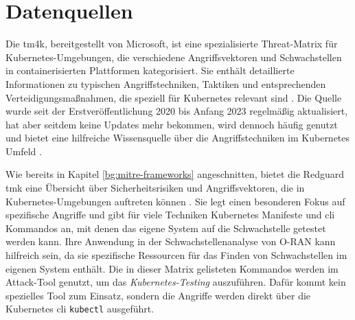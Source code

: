 \section{Datenquellen}
\label{sec:datenquellen}
\par Die \gls{tm4k}, bereitgestellt von Microsoft, ist eine spezialisierte Threat-Matrix für Kubernetes-Umgebungen, die verschiedene Angriffsvektoren und Schwachstellen in containerisierten Plattformen kategorisiert. Sie enthält detaillierte Informationen zu typischen Angriffstechniken, Taktiken und entsprechenden Verteidigungsmaßnahmen, die speziell für Kubernetes relevant sind \autocite{TacticsThreatMatrix}. Die Quelle wurde seit der Erstveröffentlichung 2020 bis Anfang 2023 regelmäßig aktualisiert, hat aber seitdem keine Updates mehr bekommen, wird dennoch häufig genutzt und bietet eine hilfreiche Wissensquelle über die Angriffstechniken im Kubernetes Umfeld \autocite{DeploymentsMicrosoftThreatMatrixforKubernetes}.

\par Wie bereits in Kapitel \ref{bg:mitre-frameworks} angeschnitten, bietet die Redguard \gls{tmk} eine Übersicht über Sicherheitsrisiken und Angriffsvektoren, die in Kubernetes-Umgebungen auftreten können \autocite{KubernetesThreatMatrix}. Sie legt einen besonderen Fokus auf spezifische Angriffe und gibt für viele Techniken Kubernetes Manifeste und \gls{cli} Kommandos an, mit denen das eigene System auf die Schwachstelle getestet werden kann. Ihre Anwendung in der Schwachstellenanalyse von O-RAN kann hilfreich sein, da sie spezifische Ressourcen für das Finden von Schwachstellen im eigenen System enthält. Die in dieser Matrix gelisteten Kommandos werden im Attack-Tool genutzt, um das \textit{Kubernetes-Testing} auszuführen. Dafür kommt kein spezielles Tool zum Einsatz, sondern die Angriffe werden direkt über die Kubernetes \gls{cli} \verb|kubectl| ausgeführt.

